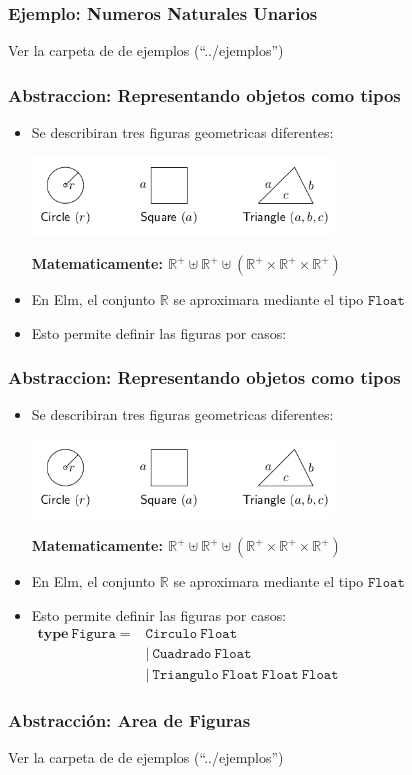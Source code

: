 \documentclass{beamer}
\begin{document}
\begin{frame}
\frametitle{Ejemplo: Numeros Naturales Unarios}
Ver la carpeta de de ejemplos (``../ejemplos'')
\end{frame}

\begin{frame}
    \frametitle{Abstraccion: Representando objetos como tipos}
    \begin{itemize}
        \item{Se describiran tres figuras geometricas diferentes:
        \begin{center}
            \includegraphics[width=8cm]{./figuras.png}
        \end{center}
        {\bf Matematicamente: $\mathbb{R^+}\uplus\mathbb{R^+}\uplus(\mathbb{R^+}\times\mathbb{R^+}\times\mathbb{R^+})$}
        }
        \item{En Elm, el conjunto $\mathbb{R}$ se aproximara mediante el tipo
        $\mathtt{Float}$}
        \item{Esto permite definir las figuras por casos:}
    \end{itemize}

\end{frame}

\begin{frame}
    \frametitle{Abstraccion: Representando objetos como tipos}
    \begin{itemize}
        \item{Se describiran tres figuras geometricas diferentes:
        \begin{center}
            \includegraphics[width=8cm]{./figuras.png}
        \end{center}
        {\bf Matematicamente: $\mathbb{R^+}\uplus\mathbb{R^+}\uplus(\mathbb{R^+}\times\mathbb{R^+}\times\mathbb{R^+})$}
        }
        \item{En Elm, el conjunto $\mathbb{R}$ se aproximara mediante el tipo
        $\mathtt{Float}$}
        \item{Esto permite definir las figuras por casos:\\
        $
        \begin{array}{ll}
            \mathbf{type}\ \mathtt{Figura=} & \mathtt{Circulo\ Float}\\
            & |\ \mathtt{Cuadrado\ Float} \\
            & |\ \mathtt{Triangulo\ Float\ Float\ Float}
        \end{array}    
        $}
    \end{itemize}

\end{frame}

\begin{frame}
\frametitle{Abstracci\'on: Area de Figuras}
Ver la carpeta de de ejemplos (``../ejemplos'')
\end{frame}
\end{document}
